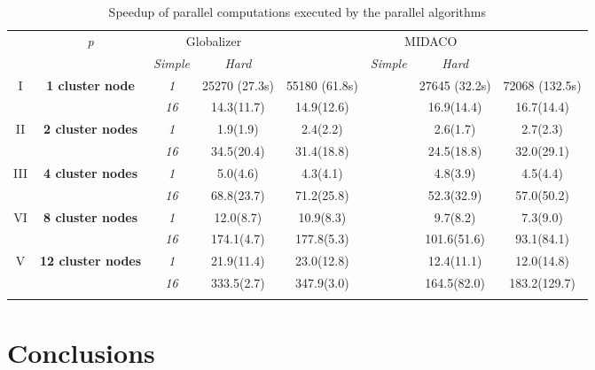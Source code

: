 \documentclass{svproc}
\begin{document}
\begin{table}
  \centering
  \caption{Speedup of parallel computations executed by the parallel algorithms}
  \label{tab:speedup}
  \begin{tabular}{cccccccc}
    \cline{3-8}\noalign{\smallskip}
    \multicolumn{2}{c}{  } & \textit{p} & \multicolumn{2}{c}{Globalizer} & &
\multicolumn{2}{c}{MIDACO}   \\
    \noalign{\smallskip} \cline{4-5} \cline{7-8}  \noalign{\smallskip}
    \multicolumn{2}{c}{  } & & \textit{Simple} & \textit{Hard} & & \textit{Simple} &
\textit{Hard}  \\
    \noalign{\smallskip}\hline
I  & \textbf{1 cluster node}  %
    & \textit{1}   & 25270 (27.3s) & 55180 (61.8s) & & 27645 (32.2s) & 72068 (132.5s)  \\
  &  & \textit{16} & 14.3(11.7) & 14.9(12.6)  & &  16.9(14.4) & 16.7(14.4) \\
  \hline \noalign{\smallskip}
II  & \textbf{2 cluster nodes}  %
  & \textit{1}      &   1.9(1.9) & 2.4(2.2)  & & 2.6(1.7) & 2.7(2.3) \\
  &   & \textit{16} & 34.5(20.4) & 31.4(18.8) & & 24.5(18.8) & 32.0(29.1) \\
    \noalign{\smallskip}\hline	\noalign{\smallskip}
III  & \textbf{4 cluster nodes}  %
& \textit{1}      & 5.0(4.6) & 4.3(4.1) & & 4.8(3.9) & 4.5(4.4) \\
&   & \textit{16} & 68.8(23.7) & 71.2(25.8) & & 52.3(32.9) & 57.0(50.2) \\
  \noalign{\smallskip}\hline	\noalign{\smallskip}
VI & \textbf{8 cluster nodes} %
& \textit{1}    & 12.0(8.7) & 10.9(8.3) & & 9.7(8.2)    & 7.3(9.0)    \\
& & \textit{16} & 174.1(4.7) & 177.8(5.3) & & 101.6(51.6) & 93.1(84.1) \\
    \noalign{\smallskip}\hline
    V & \textbf{12 cluster nodes} %
    & \textit{1}    & 21.9(11.4)  & 23.0(12.8)  & & 12.4(11.1)  & 12.0(14.8)  \\
    & & \textit{16} & 333.5(2.7) & 347.9(3.0) & & 164.5(82.0) & 183.2(129.7) \\
        \noalign{\smallskip}\hline
  \end{tabular}
\end{table}

\section{Conclusions}
\end{document}
